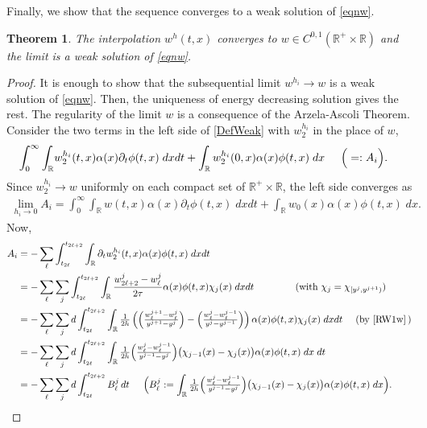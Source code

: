 \documentclass[a4paper,11pt]{article}
\def\R{\mathbb{R}}
\newtheorem{theorem}{Theorem}
\theoremstyle{remark}
\begin{document}
Finally, we show that the sequence converges to a weak solution of \eqref{eqnw}.
\begin{theorem}
  The interpolation $w^{h}(t,x)$ converges to $w\in C^{0,1}(\R^+\times\R)$ and the limit is a weak solution of \eqref{eqnw}.
\end{theorem}
\begin{proof}
It is enough to show that the subsequential limit $w^{h_i}\to w$ is a weak solution of \eqref{eqnw}. Then, the uniqueness of energy decreasing solution gives the rest. The regularity of the limit $w$ is a consequence of the Arzela-Ascoli Theorem. Consider the two terms in the left side of \eqref{DefWeak} with $w_2^{h_i}$ in the place of $w$,
\begin{align*}
 \int_0^\infty\int_\R& w_2^{h_i}(t,x) \alpha(x)\partial_t\phi(t,x)\; dx dt
 +\int_\R w_2^{h_i}(0,x)\alpha(x)\phi(t,x) \; dx\hskip 5mm \Big(=:A_i\Big).
\end{align*}
Since $w_2^{h_i} \rightarrow w$ uniformly on each compact set of $\R^+\times \R$, the left side converges as
\begin{align*}
\lim_{h_i\to0}A_i=\int_0^\infty\int_\R w(t,x) \alpha(x)\partial_t\phi(t,x)\; dx
dt+\int_\R w_0(x)\alpha(x)\phi(t,x) \; dx.
\end{align*}
Now,
\begin{align*}
 A_i&=-\sum_{\ell}\int_{t_{2\ell}}^{t_{2\ell+2}}\int_\R \partial_t
 w_2^{h_i}(t,x) \alpha(x)\phi(t,x)\; dx dt \\
 &=-\sum_{\ell}\sum_{j}\int_{t_{2\ell}}^{t_{2\ell+2}}\int_\R
 \frac{w^j_{2\ell+2}-w^j_{\ell}}{2\tau} \alpha(x) \phi(t,x) \chi_j(x)\; dx dt \hskip
 1.5cm (\text{with } \chi_j=\chi_{[y^j,y^{j+1})})\\
 &=-\sum_{\ell}\sum_{j}d\int_{t_{2\ell}}^{t_{2\ell+2}}\int_\R
 \tfrac{1}{2h} \left( \Big(\tfrac{w^{j+1}_{\ell} -
 w^{j}_{\ell}}{y^{j+1}-y^j}\Big) -\Big(\tfrac{w^{j}_{\ell} -
 w^{j-1}_{\ell}}{y^{j}-y^{j-1}} \Big)\right) \alpha(x) \phi(t,x) \chi_j(x)\; dx
 dt\quad\ (\text{by } \eqref{RW1w}\,)\\
 &=-\sum_{\ell}\sum_{j}d\int_{t_{2\ell}}^{t_{2\ell+2}}\int_\R
 \tfrac{1}{2h} \Big(\tfrac{w^{j}_{\ell} -
 w^{j-1}_{\ell}}{y^{j-1}-y^j}\Big)
 \big(\chi_{j-1}(x)-\chi_{j}(x)\big)\alpha(x) \phi(t,x) \; dx \;dt\\
 &=-\sum_{\ell}\sum_{j}d\int_{t_{2\ell}}^{t_{2\ell+2}}B_\ell^j\,dt\hskip 5mm\Big(B_\ell^j:=\int_\R \tfrac{1}{2h} \Big(\tfrac{w^{j}_{\ell} -
w^{j-1}_{\ell}}{y^{j-1}-y^j}\Big)
\big(\chi_{j-1}(x)-\chi_{j}(x)\big)\alpha(x) \phi(t,x) \; dx\Big).
\end{align*}


\end{proof}
\end{document}
